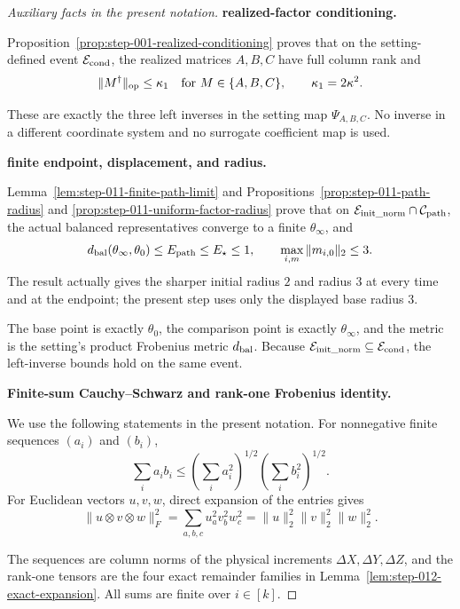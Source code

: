 \begin{proof}[Auxiliary facts in the present notation]


\medskip\noindent\textbf{realized-factor conditioning.}\par

Proposition~\ref{prop:step-001-realized-conditioning} proves that on the
setting-defined event \(\mathcal E_{\rm cond}\), the realized matrices
\(A,B,C\) have full column rank and
\[
  \|M^\dagger\|_{\rm op}\le\kappa_1
  \quad\text{for }M\in\{A,B,C\},
  \qquad \kappa_1=2\kappa^2.
\]

These are exactly the three left
inverses in the setting map \(\Psi_{A,B,C}\). No inverse in a different
coordinate system and no surrogate coefficient map is used.


\medskip\noindent\textbf{finite endpoint, displacement, and radius.}\par

Lemma~\ref{lem:step-011-finite-path-limit} and
Propositions~\ref{prop:step-011-path-radius} and
\ref{prop:step-011-uniform-factor-radius} prove that on
\(\mathcal E_{\rm init\_norm}\cap\mathcal C_{\rm path}\), the actual
balanced representatives converge to a finite \(\theta_\infty\), and
\[
  d_{\rm bal}(\theta_\infty,\theta_0)
  \le E_{\rm path}\le E_\star\le1,
  \qquad
  \max_{i,m}\|m_{i,0}\|_2\le3.
\]
The result actually gives the sharper initial radius \(2\) and
radius \(3\) at every time and at the endpoint; the present step uses only
the displayed base radius \(3\).

The base point is exactly
\(\theta_0\), the comparison point is exactly \(\theta_\infty\), and the
metric is the setting's product Frobenius metric \(d_{\rm bal}\). Because
\(\mathcal E_{\rm init\_norm}\subseteq\mathcal E_{\rm cond}\), the
left-inverse bounds hold on the same event.


\medskip\noindent\textbf{Finite-sum Cauchy--Schwarz and rank-one Frobenius identity.}\par

We use the following statements in the present notation. For nonnegative finite sequences \((a_i)\) and
\((b_i)\),
\[
  \sum_i a_i b_i
  \le\left(\sum_i a_i^2\right)^{1/2}
      \left(\sum_i b_i^2\right)^{1/2}.
\]
For Euclidean vectors \(u,v,w\), direct expansion of the entries gives
\[
  \|u\otimes v\otimes w\|_F^2
  =\sum_{a,b,c}u_a^2v_b^2w_c^2
  =\|u\|_2^2\|v\|_2^2\|w\|_2^2.
\]

The sequences are column norms of
the physical increments \(\Delta X,\Delta Y,\Delta Z\), and the rank-one
tensors are the four exact remainder families in
Lemma~\ref{lem:step-012-exact-expansion}. All sums are finite over
\(i\in[k]\).

\end{proof}



